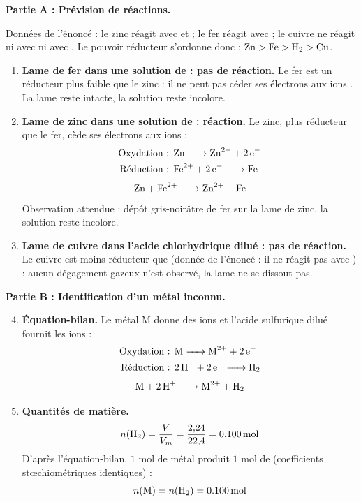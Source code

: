 \documentclass[11pt]{article}
\begin{document}
\begin{corrige}
\textbf{Partie A : Prévision de réactions.}

Données de l'énoncé : le zinc réagit avec  et  ; le fer réagit avec  ; le cuivre ne réagit ni avec  ni avec . Le pouvoir réducteur s'ordonne donc : $\ce{Zn} > \ce{Fe} > \ce{H2} > \ce{Cu}$.

\begin{enumerate}
\item \textbf{Lame de fer dans une solution de  : pas de réaction.} Le fer est un réducteur plus faible que le zinc : il ne peut pas céder ses électrons aux ions . La lame reste intacte, la solution reste incolore.

\item \textbf{Lame de zinc dans une solution de  : réaction.} Le zinc, plus réducteur que le fer, cède ses électrons aux ions  :
\begin{align*}
\text{Oxydation : } & \ce{Zn -> Zn^2+ + 2e-} \\
\text{Réduction : } & \ce{Fe^2+ + 2e- -> Fe}
\end{align*}
\[ \ce{Zn + Fe^2+ -> Zn^2+ + Fe} \]
Observation attendue : dépôt gris-noirâtre de fer sur la lame de zinc, la solution reste incolore.

\item \textbf{Lame de cuivre dans l'acide chlorhydrique dilué : pas de réaction.} Le cuivre est moins réducteur que  (donnée de l'énoncé : il ne réagit pas avec ) : aucun dégagement gazeux n'est observé, la lame ne se dissout pas.
\end{enumerate}

\textbf{Partie B : Identification d'un métal inconnu.}

\begin{enumerate}
\setcounter{enumi}{3}
\item \textbf{Équation-bilan.} Le métal M donne des ions  et l'acide sulfurique dilué fournit les ions  :
\begin{align*}
\text{Oxydation : } & \ce{M -> M^2+ + 2e-} \\
\text{Réduction : } & \ce{2H+ + 2e- -> H2}
\end{align*}
\[ \ce{M + 2H+ -> M^2+ + H2} \]

\item \textbf{Quantités de matière.}
\[ n(\ce{H2}) = \frac{V}{V_m} = \frac{2{,}24}{22{,}4} = \SI{0,100}{mol} \]
D'après l'équation-bilan, $1$ mol de métal produit $1$ mol de  (coefficients stœchiométriques identiques) :
\[ n(\ce{M}) = n(\ce{H2}) = \SI{0,100}{mol} \]


\end{enumerate}
\end{corrige}
\end{document}
